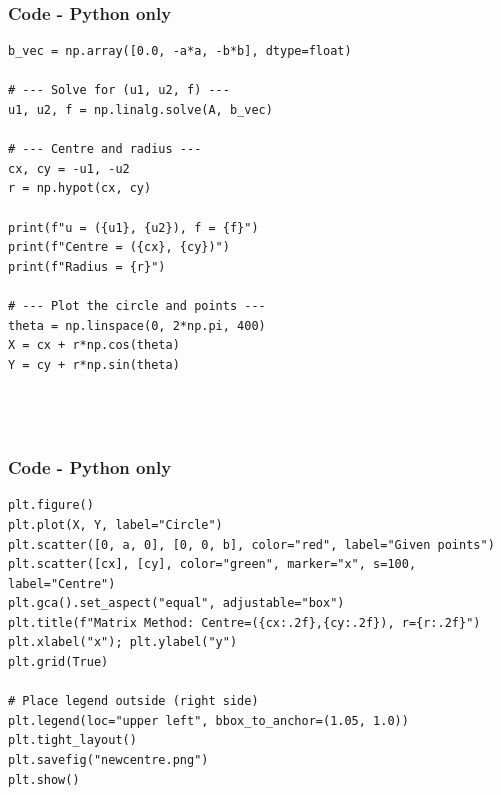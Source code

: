 \documentclass{beamer}
\theoremstyle{remark}
\numberwithin{equation}{section}
\begin{document}
\begin{frame}[fragile]
\frametitle{Code - Python only}
\begin{lstlisting}
b_vec = np.array([0.0, -a*a, -b*b], dtype=float)

# --- Solve for (u1, u2, f) ---
u1, u2, f = np.linalg.solve(A, b_vec)

# --- Centre and radius ---
cx, cy = -u1, -u2
r = np.hypot(cx, cy)

print(f"u = ({u1}, {u2}), f = {f}")
print(f"Centre = ({cx}, {cy})")
print(f"Radius = {r}")

# --- Plot the circle and points ---
theta = np.linspace(0, 2*np.pi, 400)
X = cx + r*np.cos(theta)
Y = cy + r*np.sin(theta)




\end{lstlisting}
\end{frame}

\begin{frame}[fragile]
\frametitle{Code - Python only}
\begin{lstlisting}
plt.figure()
plt.plot(X, Y, label="Circle")
plt.scatter([0, a, 0], [0, 0, b], color="red", label="Given points")
plt.scatter([cx], [cy], color="green", marker="x", s=100, label="Centre")
plt.gca().set_aspect("equal", adjustable="box")
plt.title(f"Matrix Method: Centre=({cx:.2f},{cy:.2f}), r={r:.2f}")
plt.xlabel("x"); plt.ylabel("y")
plt.grid(True)

# Place legend outside (right side)
plt.legend(loc="upper left", bbox_to_anchor=(1.05, 1.0))
plt.tight_layout()
plt.savefig("newcentre.png")
plt.show()



\end{lstlisting}
\end{frame}
\end{document}
